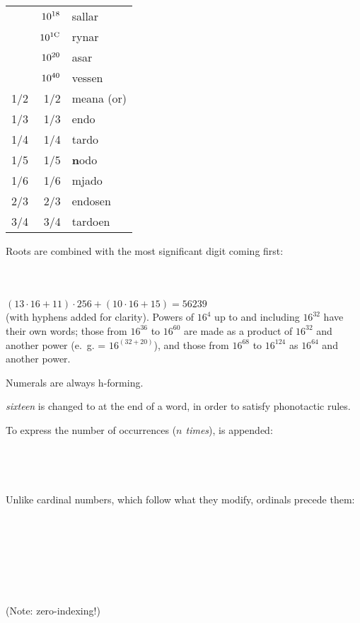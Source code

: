\documentclass{book}
\begin{document}
\begin{longtable}[c]{|r|r|l|}
  & $\textmd{10}^{\textmd{18}}$ & sallar \\
  & $\textmd{10}^{\textmd{1C}}$ & rynar \\
  & $\textmd{10}^{\textmd{20}}$ & asar \\
  & $\textmd{10}^{\textmd{40}}$ & vessen \\
  \hline
  \hline
  1/2 & 1/2 & meana (or) \\
  1/3 & 1/3 & endo \\
  1/4 & 1/4 & tardo \\
  1/5 & 1/5 & \textbf{n}odo \\
  1/6 & 1/6 & mjado \\
  2/3 & 2/3 & endosen \\
  3/4 & 3/4 & tardoen \\
  \hline
\end{longtable}

Roots are combined with the most significant digit coming first: \\
~\\
 \\
 \\
$(13 \cdot 16 + 11) \cdot 256 + (10 \cdot 16 + 15) = 56239$ \\

(with hyphens added for clarity). Powers of $16^4$ up to and including $16^32$ have their own words; those from $16^36$ to $16^60$ are made as a product of $16^32$ and another power (e.~g.  = $16^(32 + 20)$), and those from $16^68$ to $16^124$ as $16^64$ and another power.

Numerals are always h-forming.

 \emph{sixteen} is changed to  at the end of a word, in order to satisfy phonotactic rules.

To express the number of occurrences (\emph{$n$ times}),  is appended: \\
~\\
    \\
    \\
    \\

Unlike cardinal numbers, which follow what they modify, ordinals precede them: \\
~\\
  \\
  \\
  \\
~\\
  \\
  \\
  (Note: zero-indexing!) \\
\end{document}
